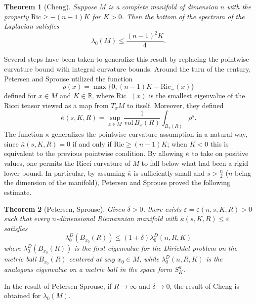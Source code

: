 \documentclass{amsart}
\newtheorem{theorem}{Theorem}[section]
\theoremstyle{definition}
\theoremstyle{remark}
\numberwithin{equation}{section}
\begin{document}
\begin{theorem}[Cheng] Suppose $M$ is a complete manifold of dimension $n$ with the property $\text{Ric} \geq -(n-1)K$ for $K>0$. Then the bottom of the spectrum of the Laplacian satisfies
\begin{equation*}
\lambda_0(M)\leq \frac{(n-1)^2K}{4}.
\end{equation*}
\end{theorem}

Several steps have been taken to generalize this result by replacing the pointwise curvature bound with integral curvature bounds. Around the turn of the century, Petersen and Sprouse \cite{PS} utilized the function
\begin{equation*}
\rho(x) = \max\{0,(n-1)K-\text{Ric}_-(x)\}
\end{equation*}
defined for $x\in M$ and $K\in \mathbb{R}$, where $\text{Ric}_-(x)$ is the smallest eigenvalue of the Ricci tensor viewed as a map from $T_xM$ to itself. Moreover, they defined
\begin{equation*}
\overline{\kappa}(s,K,R)=\sup_{x\in M}\frac{1}{\text{vol}\,B_x(R)}\int_{B_x(R)}\rho^s.
\end{equation*}
The function $\overline{\kappa}$ generalizes the pointwise curvature assumption in a natural way, since $\overline{\kappa}(s,K,R)=0$ if and only if $\text{Ric}\geq (n-1)K$; when $K<0$ this is equivalent to the previous pointwise condition. By allowing $\overline{\kappa}$ to take on positive values, one permits the Ricci curvature of $M$ to fall below what had been a rigid lower bound. In particular, by assuming $\overline{\kappa}$ is sufficiently small and $s>\frac{n}{2}$ ($n$ being the dimension of the manifold), Petersen and Sprouse proved the following estimate.

\begin{theorem}[Petersen, Sprouse] Given $\delta>0$, there exists $\varepsilon = \varepsilon(n,s,K,R)>0$ such that every $n$-dimensional Riemannian manifold with $\overline{\kappa}(s,K,R)\leq \varepsilon$ satisfies
\begin{equation*}
\lambda_0^D(B_{x_0}(R))\leq (1+\delta)\lambda_0^D(n,R,K)
\end{equation*}
where $\lambda_0^D(B_{x_0}(R))$ is the first eigenvalue for the Dirichlet problem on the metric ball $B_{x_0}(R)$ centered at any $x_0\in M$, while $\lambda_0^D(n,R,K)$ is the analogous eigenvalue on a metric ball in the space form $S_K^n$. 
\end{theorem}
In the result of Petersen-Sprouse, if $R\to\infty$ and $\delta\to 0$, the result of Cheng is obtained for $\lambda_0(M)$.
\end{document}
